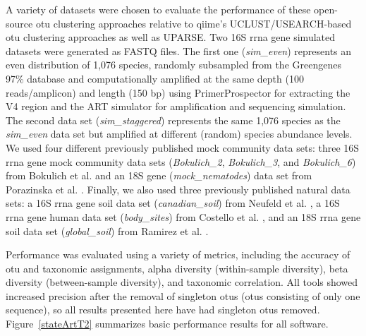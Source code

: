 A variety of datasets were chosen to evaluate the performance of these open-source
\gls{otu} clustering approaches relative to \gls{qiime}’s UCLUST/USEARCH-based
\gls{otu} clustering approaches as well as UPARSE. Two 16S \gls{rrna} gene simulated
datasets were generated as FASTQ files. The first one (\emph{sim\_even}) represents
an even distribution of 1,076 species, randomly subsampled from the Greengenes
97\% \cite{DeSantis2006, McDonald2012} database and computationally amplified at
the same depth (100 reads/amplicon) and length (150 \gls{bp}) using
PrimerProspector \cite{Walters2011} for extracting the V4 region and the ART \cite{Huang2012}
simulator for amplification and sequencing simulation. The second data set (\emph{sim\_staggered})
represents the same 1,076 species as the \emph{sim\_even} data set but amplified at
different (random) species abundance levels. We used four different previously published
mock community data sets: three 16S \gls{rrna} gene mock community data sets
(\emph{Bokulich\_2}, \emph{Bokulich\_3}, and \emph{Bokulich\_6}) from Bokulich
et al. \cite{Bokulich2013} and an 18S gene (\emph{mock\_nematodes}) data set from
Porazinska et al. \cite{Porazinska2009}. Finally, we also used three previously
published natural data sets: a 16S \gls{rrna} gene soil data set (\emph{canadian\_soil})
from Neufeld et al. \cite{Neufeld2011}, a 16S \gls{rrna} gene human data set (\emph{body\_sites})
from Costello et al. \cite{Costello2009}, and an 18S \gls{rrna} gene soil data set
(\emph{global\_soil}) from Ramirez et al. \cite{Ramirez2014}.

Performance was evaluated using a variety of metrics, including the accuracy of
\gls{otu} and taxonomic assignments, alpha diversity (within-sample diversity),
beta diversity (between-sample diversity), and taxonomic correlation. All tools
showed increased precision after the removal of singleton \gls{otu}s (\gls{otu}s
consisting of only one sequence), so all results presented here have had singleton
\gls{otu}s removed. Figure~\ref{stateArtT2} summarizes basic performance results
for all software.


